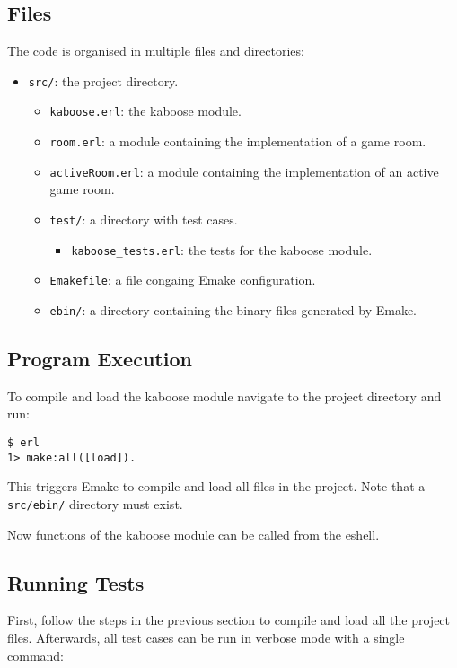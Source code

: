 \documentclass[11pt, a4paper]{article}
\begin{document}
\subsection{Files}
The code is organised in multiple files and directories:
\begin{itemize}
	\item \texttt{src/}: the project directory. 
	\begin{itemize}
		\item \texttt{kaboose.erl}: the kaboose module.
		\item \texttt{room.erl}: a module containing the implementation of a game room.
		\item \texttt{activeRoom.erl}: a module containing the implementation of an active game room.
		\item \texttt{test/}: a directory with test cases.
		\begin{itemize}
			\item \texttt{kaboose\_tests.erl}: the tests for the kaboose module.
		\end{itemize}
		\item \texttt{Emakefile}: a file congaing Emake configuration.
		\item \texttt{ebin/}: a directory containing the binary files generated by Emake.
	\end{itemize}
\end{itemize}

\subsection{Program Execution}
To compile and load the kaboose module navigate to the project directory and run:

\begin{verbatim}
$ erl
1> make:all([load]).
\end{verbatim}

This triggers Emake to compile and load all files in the project. Note that a \texttt{src/ebin/} directory must exist.

Now functions of the kaboose module can be called from the eshell.


\subsection{Running Tests}
First, follow the steps in the previous section to compile and load all the project files. Afterwards, all test cases can be run in verbose mode with a single command:
\end{document}
